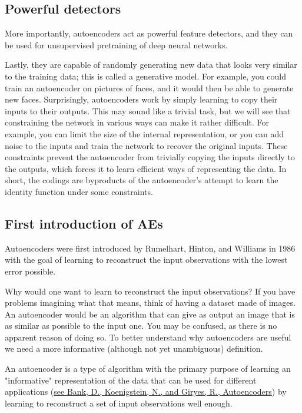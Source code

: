 \documentclass[%
oneside,                 %
final,                   %
10pt]{article}
\begin{document}
\subsection{Powerful detectors}

More importantly, autoencoders act as powerful feature detectors, and
they can be used for unsupervised pretraining of deep neural networks.

Lastly, they are capable of randomly generating new data that looks
very similar to the training data; this is called a generative
model. For example, you could train an autoencoder on pictures of
faces, and it would then be able to generate new faces.  Surprisingly,
autoencoders work by simply learning to copy their inputs to their
outputs. This may sound like a trivial task, but we will see that
constraining the network in various ways can make it rather
difficult. For example, you can limit the size of the internal
representation, or you can add noise to the inputs and train the
network to recover the original inputs. These constraints prevent the
autoencoder from trivially copying the inputs directly to the outputs,
which forces it to learn efficient ways of representing the data. In
short, the codings are byproducts of the autoencoder’s attempt to
learn the identity function under some constraints.

\subsection{First introduction of AEs}

Autoencoders were first introduced by Rumelhart, Hinton, and Williams
in 1986 with the goal of learning to reconstruct the input
observations with the lowest error possible.

Why would one want to learn to reconstruct the input observations? If
you have problems imagining what that means, think of having a dataset
made of images. An autoencoder would be an algorithm that can give as
output an image that is as similar as possible to the input one. You
may be confused, as there is no apparent reason of doing so. To better
understand why autoencoders are useful we need a more informative
(although not yet unambiguous) definition.

\begin{block}{}
An autoencoder is a type of algorithm with the primary purpose of learning an "informative" representation of the data that can be used for different applications (\href{{https://arxiv.org/abs/2003.05991}}{see Bank, D., Koenigstein, N., and Giryes, R., Autoencoders}) by learning to reconstruct a set of input observations well enough.
\end{block}
\end{document}
